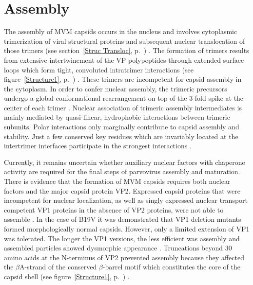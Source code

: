 \section{Assembly}
\label{Assembly}

The assembly of MVM capsids occurs in the nucleus and involves cytoplasmic trimerization of viral structural proteins and subsequent nuclear translocation of those trimers (see section~\ref{Struc Transloc}, p.~\pageref{Struc Transloc}) \cite{pmid16469332}. The formation of trimers results from extensive intertwinement of the VP polypeptides through extended surface loops which form tight, convoluted intratrimer interactions (see figure~\ref{Structure1}, p.~\pageref{Structure1}) \cite{pmid15299974, pmid21867712}. These trimers are incompetent for capsid assembly in the cytoplasm. In order to confer nuclear assembly, the trimeric precursors undergo a global conformational rearrangement on top of the 3-fold spike at the center of each trimer \cite{pmid16469332, pmid12552010, pmid17626084}. Nuclear association of trimeric assembly intermediates is mainly mediated by quasi-linear, hydrophobic interactions between trimeric subunits. Polar interactions only marginally contribute to capsid assembly and stability. Just a few conserved key residues which are invariably located at the intertrimer interfaces participate in the strongest interactions \cite{pmid14981262}.     

Currently, it remains uncertain whether auxiliary nuclear factors with chaperone activity are required for the final steps of parvovirus assembly and maturation. There is evidence that the formation of MVM capsids requires both nuclear factors and the major capsid protein VP2. Expressed capsid proteins that were incompetent for nuclear localization, as well as singly expressed nuclear transport competent VP1 proteins in the absence of VP2 proteins, were not able to assemble \cite{pmid12072505, pmid10438891, pmid10729155}. In the case of B19V it was demonstrated that VP1 deletion mutants formed morphologically normal capsids. However, only a limited extension of VP1 was tolerated. The longer the VP1 versions, the less efficient was assembly and assembled particles showed dysmorphic appearance \cite{pmid8207846}. Truncations beyond 30 amino acids at the N-terminus of VP2 prevented assembly because they affected the $\beta$A-strand of the conserved $\beta$-barrel motif which constitutes the core of the capsid shell (see figure~\ref{Structure1}, p.~\pageref{Structure1}) \cite{pmid7666560}.     


